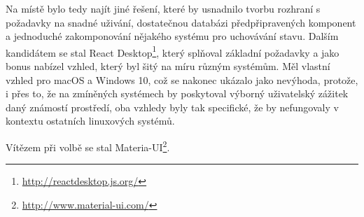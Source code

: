 Na místě bylo tedy najít jiné řešení, které by usnadnilo tvorbu rozhraní s požadavky na snadné uživání, dostatečnou databázi předpřipravených komponent a jednoduché zakomponování nějakého systému pro uchovávání stavu. Dalším kandidátem se stal React Desktop\footnote{\url{http://reactdesktop.js.org/}}, který splňoval základní požadavky a jako bonus nabízel vzhled, který byl šitý na míru různým systémům. Měl vlastní vzhled pro macOS a Windows 10, což se nakonec ukázalo jako nevýhoda, protože, i přes to, že na zmíněných systémech by poskytoval výborný uživatelský zážitek daný známostí prostředí, oba vzhledy byly tak specifické, že by nefungovaly v kontextu ostatních linuxových systémů.

Vítězem při volbě se stal Materia-UI\footnote{\url{http://www.material-ui.com/}}.




